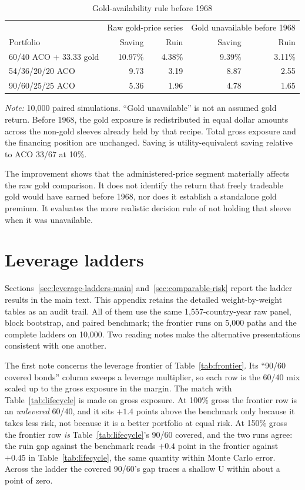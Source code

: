 \documentclass[11pt]{article}
\begin{document}
\begin{table}[H]
\centering
\caption{Gold-availability rule before 1968}
\label{tab:gold-availability}
\begin{tabular}{lrrrr}
\toprule
& \multicolumn{2}{c}{Raw gold-price series}
& \multicolumn{2}{c}{Gold unavailable before 1968} \\
Portfolio & Saving & Ruin & Saving & Ruin \\
\midrule
60/40 ACO $+$ 33.33 gold & 10.97\% & 4.38\% & 9.39\% & 3.11\% \\
54/36/20/20 ACO & 9.73 & 3.19 & 8.87 & 2.55 \\
90/60/25/25 ACO & 5.36 & 1.96 & 4.78 & 1.65 \\
\bottomrule
\end{tabular}
\begin{minipage}{0.96\textwidth}\footnotesize
\textit{Note:} 10,000 paired simulations. ``Gold unavailable'' is not an
assumed gold return. Before 1968, the gold exposure is redistributed in equal
dollar amounts across the non-gold sleeves already held by that recipe. Total
gross exposure and the financing position are unchanged. Saving is
utility-equivalent saving relative to ACO 33/67 at 10\%.
\end{minipage}
\end{table}

The improvement shows that the administered-price segment materially affects
the raw gold comparison. It does not identify the return that freely tradeable
gold would have earned before 1968, nor does it establish a standalone gold
premium. It evaluates the more realistic decision rule of not holding that
sleeve when it was unavailable.

\section{Leverage ladders}
\label{app:leverage-ladders}

Sections~\ref{sec:leverage-ladders-main} and~\ref{sec:comparable-risk} report
the ladder results in the main text. This appendix retains the detailed
weight-by-weight tables as an audit trail. All of them use the same
1{,}557-country-year raw panel, block bootstrap, and paired benchmark; the
frontier runs on 5{,}000 paths and the complete ladders on 10{,}000. Two
reading notes make the alternative presentations consistent with one another.

The first note concerns the leverage frontier of Table~\ref{tab:frontier}. Its
``90/60 covered bonds'' column sweeps a leverage multiplier, so each row is
the 60/40 mix scaled up to the gross exposure in the margin. The match with
Table~\ref{tab:lifecycle} is made on gross exposure. At 100\% gross the
frontier row is an \emph{unlevered} 60/40, and it sits $+1.4$ points above the
benchmark only because it takes less risk, not because it is a better
portfolio at equal risk. At 150\% gross the frontier row \emph{is}
Table~\ref{tab:lifecycle}'s 90/60 covered, and the two runs agree: the ruin
gap against the benchmark reads $+0.4$ point in the frontier against $+0.45$
in Table~\ref{tab:lifecycle}, the same quantity within Monte Carlo error.
Across the ladder the covered 90/60's gap traces a shallow U within about a
point of zero.
\end{document}
